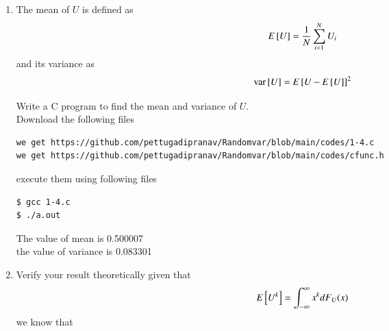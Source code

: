 \documentclass[journal,12pt,twocolumn]{IEEEtran}
\renewcommand\thesection{\arabic{section}}
\begin{document}
\begin{enumerate}[label=\thesection.\arabic*
,ref=\thesection.\theenumi]
The CDF of $U$ is given by
		\begin{align}
			F_U(x) = \pr{U \leq x} = \int_{-\infty}^{x}p_U(u)du
		\end{align}
We now have three cases:
		\begin{enumerate}
			\item $x < 0$: $p_X(x) = 0$, and hence $F_U(x) = 0$.
			\item $0 \leq x < 1$: Here,
				\begin{align}
					F_U(x) = \int_{0}^{x}du = x
					\label{eq:cdf-uni}
				\end{align}
		\item for $x>1$   $F_U(x)=1$
		\end{enumerate}
Therefore,
		\begin{align}
			F_U(x) = 
			\begin{cases}
				0 & x < 0 \\
				x & 0 \leq x < 1 \\
				1 & x \geq 1
			\end{cases}
			\label{eq:cdf-ans}
		\end{align}
		
\item
The mean of $U$ is defined as
%
\begin{equation}
E{}\left[U\right] = \frac{1}{N}\sum_{i=1}^{N}U_i
\end{equation}
%
and its variance as
%
\begin{equation}
\text{var}{}\left[U\right] = E{}\left[U- E{}\left[U\right]\right]^2 
\end{equation}

Write a C program to  find the mean and variance of $U$. \\
\solution Download the following files 
\begin{lstlisting}
we get https://github.com/pettugadipranav/Randomvar/blob/main/codes/1-4.c
we get https://github.com/pettugadipranav/Randomvar/blob/main/codes/cfunc.h
\end{lstlisting}
execute them using following files
\begin{lstlisting}
$ gcc 1-4.c
$ ./a.out
\end{lstlisting}
The value of mean is 0.500007\\
the value of variance is  0.083301\\
\item Verify your result theoretically given that
\begin{equation}
E{}\left[U^k\right] = \int_{-\infty}^{\infty}x^k d F_{U}(x)
\end{equation}
\solution we know that \\ 


\end{enumerate}
\end{document}
